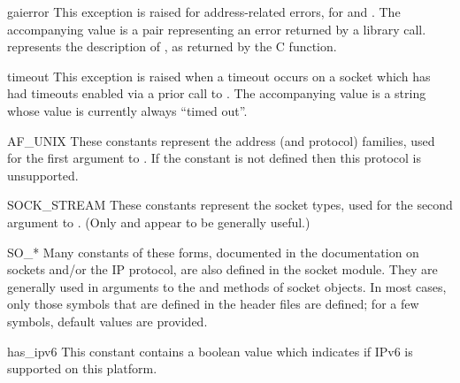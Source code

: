 \begin{excdesc}{gaierror}
This exception is raised for address-related errors, for
 and .
The accompanying value is a pair 
representing an error returned by a library call.
 represents the description of , as returned
by the  C function.
\end{excdesc}

\begin{excdesc}{timeout}
This exception is raised when a timeout occurs on a socket which has
had timeouts enabled via a prior call to .  The
accompanying value is a string whose value is currently always ``timed
out''.
\end{excdesc}

\begin{datadesc}{AF_UNIX}
These constants represent the address (and protocol) families,
used for the first argument to .  If the
 constant is not defined then this protocol is
unsupported.
\end{datadesc}

\begin{datadesc}{SOCK_STREAM}
These constants represent the socket types,
used for the second argument to .
(Only  and
 appear to be generally useful.)
\end{datadesc}

\begin{datadesc}{SO_*}
Many constants of these forms, documented in the \UNIX{} documentation on
sockets and/or the IP protocol, are also defined in the socket module.
They are generally used in arguments to the  and
 methods of socket objects.  In most cases, only
those symbols that are defined in the \UNIX{} header files are defined;
for a few symbols, default values are provided.
\end{datadesc}

\begin{datadesc}{has_ipv6}
This constant contains a boolean value which indicates if IPv6 is
supported on this platform.
\end{datadesc}

